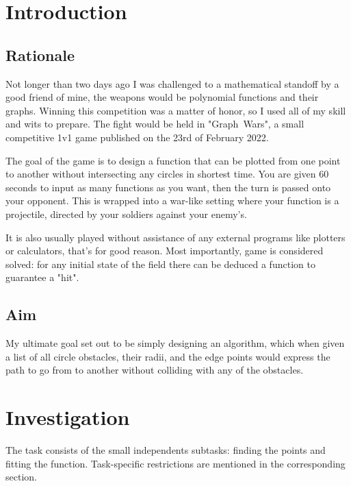 \documentclass[12pt, titlepage]{article}
\title{}
\author{Artur Roos}
\date{October 2022}
\begin{document}
\maketitle
\tableofcontents

\section{Introduction}
\subsection{Rationale}
Not longer than two days ago I was challenged to a mathematical standoff by a 
good friend of mine, the weapons would be polynomial functions and their 
graphs. Winning this competition was a matter of honor, so I used all of my 
skill and wits to prepare. The fight would be held in \mbox{"Graph Wars"}, a 
small competitive 1v1 game published on the 23rd of February 2022. 

The goal of the game is to design a function that can be plotted from one point
to another without intersecting any circles in shortest time. You are given 
60 seconds to input as many functions as you want, then the turn is passed onto
your opponent.
This is wrapped into a war-like setting where your function is a projectile, 
directed by your soldiers against your enemy's.

It is also usually played without assistance of any external programs like 
plotters or calculators, that's for good reason. Most importantly, game is
considered solved: for any initial state of the field there can be deduced a 
function to guarantee a "hit". 

\subsection{Aim}
My ultimate goal  set out to be simply designing an algorithm, which when given
a list of all circle obstacles, their radii, and the edge points would express
the path to go from to another without colliding with any of the obstacles. 

\section{Investigation}
The task consists of the small independents subtasks: finding the points and 
fitting the function. Task-specific restrictions are mentioned in the 
corresponding section.
\end{document}
